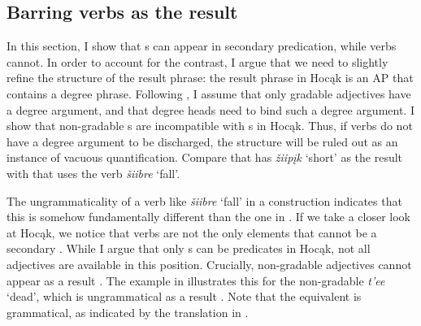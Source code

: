 \documentclass[output=paper]{LSP/langsci}
\begin{document}
\subsection{Barring verbs as the result}

In this section, I show that s can appear in  secondary predication, while verbs cannot. In order to account for the contrast, I argue that we need to slightly refine the structure of the result phrase: the result phrase in Hocąk is an AP that contains a degree phrase. Following \citet{Corver1997},  I assume that only gradable adjectives have a degree argument, and that degree heads need to bind such a degree argument. I show that non-gradable s are incompatible with s in Hocąk. Thus, if verbs do not have a degree argument to be discharged, the structure will be ruled out as an instance of vacuous quantification. Compare  that has \textit{žiipįk} `short' as the result with  that uses the verb \textit{šiibre} `fall'.

\begin{exe}



\end{exe}

The ungrammaticality of a verb like \textit{šiibre} `fall' in a  construction  indicates that this  is somehow fundamentally different than the one in . If we take a closer look at Hocąk, we notice that verbs are not the only elements that cannot be a secondary  . While I argue that only s can be  predicates in Hocąk, not all adjectives are available in this position. Crucially, non-gradable adjectives cannot appear as a result . The example in  illustrates this for the non-gradable  \textit{t'ee} `dead', which is ungrammatical as a result . Note that the  equivalent is grammatical, as indicated by the translation in .
\end{document}
